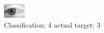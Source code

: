 \begin{figure}[h!]
\begin{center}
\includegraphics[width=0.60\columnwidth]{figures/ID2787_class_4_target_3.png}
\end{center}
\caption{ Classification: 4 actual target: 3}
\label{fig:ID2787_class_4_target_3}
\end{figure}
